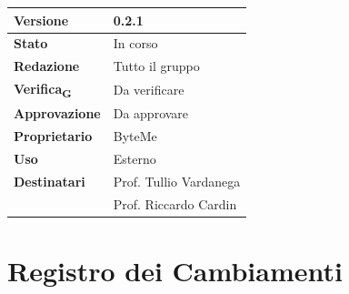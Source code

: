 \documentclass[11pt,a4paper]{article}
\newcommand{\gls}[1]{#1\textsubscript{G}}
\begin{document}
\begin{titlepage}
    \begin{table}[H]
        \centering
        \begin{tabular}{|l|p{5cm}|}
            \hline
            \textbf{Versione} & 0.2.1 \\
            \hline
            \textbf{Stato} & In corso \\
            \hline
            \textbf{Redazione} & Tutto il gruppo\\
            \hline
            \textbf{\gls{Verifica}} & Da verificare\\
            \hline
            \textbf{Approvazione} & Da approvare\\
            \hline
            \textbf{Proprietario} & ByteMe \\
            \hline
            \textbf{Uso} & Esterno \\
            \hline
            \textbf{Destinatari} & Prof. Tullio Vardanega \\ & Prof. Riccardo Cardin \\
            \hline
        \end{tabular}
    \end{table}
    
    \vfill
\end{titlepage}

\thispagestyle{empty}
\section*{Registro dei Cambiamenti}
\end{document}
